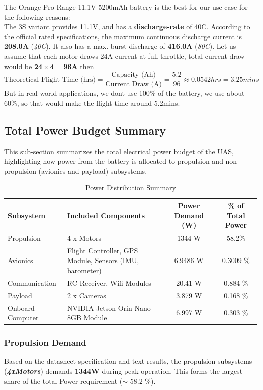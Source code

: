 \documentclass[12pt]{report}
\begin{document}
      The Orange Pro-Range 11.1V 5200mAh battery is the best for our use case for the following reasons: \\

      The 3S variant provides 11.1V, and has a \textbf{discharge-rate} of 40C. According to the official rated specifications, the maximum continuous discharge current is \textbf{208.0A} (\textit{40C}). It also has a max. burst discharge of \textbf{416.0A} (\textit{80C}). Let us assume that each motor draws 24A current at full-throttle, total current draw would be $ \boldsymbol{24 \times 4 = 96A} $ then \vspace{0.5cm} \[ \text{Theoretical Flight Time (hrs)} = \frac{\text{Capacity (Ah)}}{\text{Current Draw (A)}} = \frac{5.2}{96} \approx 0.0542 hrs = 3.25 mins \] But in real world applications, we dont use 100\% of the battery, we use about 60\%, so that would make the flight time around 5.2mins. 
          
      \subsection{Total Power Budget Summary}
      This sub-section summarizes the total electrical power budget of the UAS, highlighting how power from the battery is allocated to propulsion and non-propulsion (avionics and payload) subsystems.
      \begin{table}[h!]
        \centering
        \caption{Power Distribution Summary}
        \begin{tabular}{|l|p{5.5cm}|c|c|}
          \hline
          \textbf{Subsystem} & \textbf{Included Components} & \textbf{Power Demand (W)} & \textbf{\% of Total Power} \\
          \hline
          Propulsion & {\small 4 x Motors} & 1344 W & 58.2\% \\
          Avionics & {\small Flight Controller, GPS Module, Sensors (IMU, barometer)} & 6.9486 W & 0.3009 \% \\
          Communication & {\small RC Receiver, Wifi Modules}  & 20.41 W & 0.884 \% \\
          Payload & {\small 2 x Cameras} & 3.879 W & 0.168 \% \\
          Onboard Computer  & {\small NVIDIA Jetson Orin Nano 8GB Module} & 6.997 W & 0.303 \% \\
          \hline
        \end{tabular}
      \end{table}

        \subsubsection{\large Propulsion Demand}
        Based on the datasheet specification and text results, the propulsion subsystems (\textbf{\textit{4xMotors}}) demands \textbf{1344W} during peak operation. This forms the largest share of the total Power requirement ($ \sim $ 58.2 \%).
\end{document}
